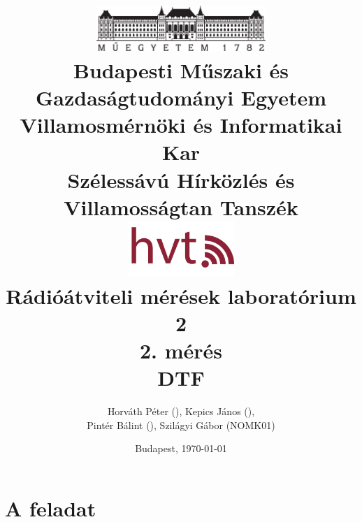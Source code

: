 \frenchspacing
\pagestyle{plain} 


\title{
    \centering
    \includegraphics[width=0.48\textwidth]{kep/bme_logo.pdf} \\
    \vspace{0.5cm}
    \large{\bf Budapesti Műszaki és Gazdaságtudományi Egyetem \\
    Villamosmérnöki és Informatikai Kar \\
    Szélessávú Hírközlés és Villamosságtan Tanszék}\\
    \vspace{0.5cm}
    \includegraphics[width=0.3\textwidth]{kep/hvt_logo.png} \\
    \vspace{3cm}
    \Large{Rádióátviteli mérések laboratórium 2} \\
    \vspace{2cm}
    \Large{\bf{2. mérés\\DTF}} \\
    \vspace{2cm}
}



\author{Horváth Péter (), Kepics János (),\\Pintér Bálint (), Szilágyi Gábor (NOMK01)}
\date{Budapest, \today}



%
\maketitle
\setcounter{page}{2}
\section{A feladat}
%
%
%
\clearpage
\appendix
%



